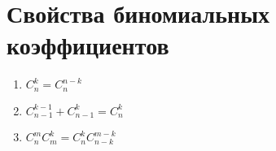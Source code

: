 \documentclass[discrete.tex]{subfiles}
\begin{document}
\section{Свойства биномиальных коэффициентов}
\begin{enumerate}
  \item $C_n^k = C_n^{n-k}$
  \item $C^{k-1}_{n-1} + C^k_{n-1} = C^k_n$
  \item $C^m_n C^k_m = C^k_n C^{m-k}_{n-k}$
\end{enumerate}
\end{document}
